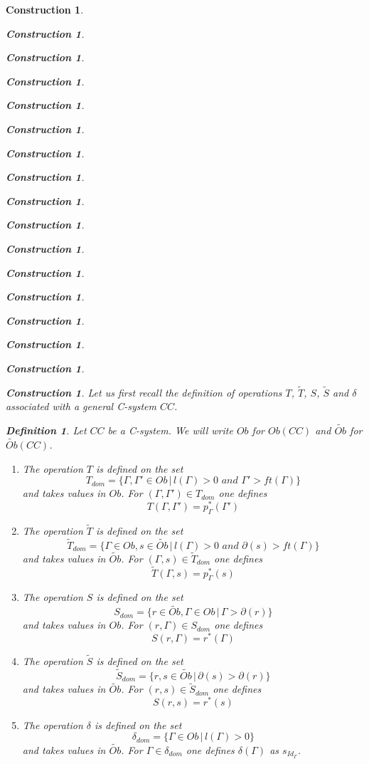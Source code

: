 \documentclass[onecolumn,12pt]{amsart}
\newtheorem{definition}[proposition]{Definition}
\numberwithin{proposition}{subsection}
\newtheorem{construction}[proposition]{Construction}
\newcommand{\wt}{\widetilde}
\begin{document}
\begin{construction}
\begin{construction}
\begin{construction}
\begin{construction}
\begin{construction}
\begin{construction}
\begin{construction}
\begin{construction}
\begin{construction}
\begin{construction}
\begin{construction}
\begin{construction}
\begin{construction}
\begin{construction}
\begin{construction}
\begin{construction}
\begin{construction}
Let us first recall the definition of operations $T$, $\wt{T}$, $S$, $\wt{S}$
and $\delta$ associated with a general C-system $CC$.
%
\begin{definition}
\label{2015.08.26.def1}
Let $CC$ be a C-system. We will write $Ob$ for $Ob(CC)$ and $\wt{Ob}$ for $\wt{Ob}(CC)$. 
%
%
\begin{enumerate}
\item The operation $T$ is defined on the set
%
$$T_{dom}=\{\Gamma,\Gamma'\in Ob\,|\,l(\Gamma)>0\,\,and\,\, \Gamma'>ft(\Gamma)\}$$
%
and takes values in $Ob$. For $(\Gamma,\Gamma')\in T_{dom}$ one defines
%
$$T(\Gamma,\Gamma')=p_{\Gamma}^*(\Gamma')$$
%
\item The operation $\wt{T}$ is defined on the set
%
$$\wt{T}_{dom}=\{\Gamma\in Ob, s\in \wt{Ob}\,|\,l(\Gamma)>0\,\,and\,\, \partial(s)>ft(\Gamma)\}$$
%
and takes values in $\wt{Ob}$. For $(\Gamma,s)\in \wt{T}_{dom}$ one defines
%
$$\wt{T}(\Gamma,s)=p_{\Gamma}^*(s)$$
%
\item The operation $S$ is defined on the set
%
$$S_{dom}=\{r\in \wt{Ob}, \Gamma\in Ob\,|\,\Gamma>\partial(r)\}$$
%
and takes values in $Ob$. For $(r,\Gamma)\in S_{dom}$ one defines
%
$$S(r,\Gamma)=r^*(\Gamma)$$
%
\item The operation $\wt{S}$ is defined on the set 
%
$$\wt{S}_{dom}=\{r,s\in \wt{Ob}\,|\,\partial(s)>\partial(r)\}$$
%
and takes values in $\wt{Ob}$. For $(r,s)\in \wt{S}_{dom}$ one defines
%
$$S(r,s)=r^*(s)$$
%
\item The operation $\delta$ is defined on the set 
%
$$\delta_{dom}=\{\Gamma\in Ob\,|\,l(\Gamma)>0\}$$
%
and takes values in $\wt{Ob}$. For $\Gamma\in \delta_{dom}$ one defines $\delta(\Gamma)$ as $s_{Id_{\Gamma}}$. 
\end{enumerate}
\end{definition}
%


\end{construction}
\end{construction}
\end{construction}
\end{construction}
\end{construction}
\end{construction}
\end{construction}
\end{construction}
\end{construction}
\end{construction}
\end{construction}
\end{construction}
\end{construction}
\end{construction}
\end{construction}
\end{construction}
\end{construction}
\end{document}
